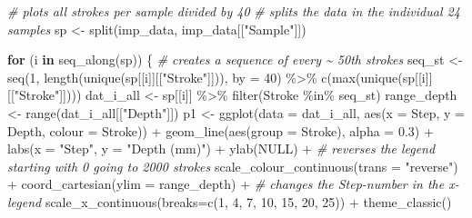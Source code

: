 \documentclass[
]{article}
\newenvironment{Shaded}{\begin{snugshade}}{\end{snugshade}}
\newcommand{\AttributeTok}[1]{\textcolor[rgb]{0.77,0.63,0.00}{#1}}
\newcommand{\CommentTok}[1]{\textcolor[rgb]{0.56,0.35,0.01}{\textit{#1}}}
\newcommand{\ConstantTok}[1]{\textcolor[rgb]{0.00,0.00,0.00}{#1}}
\newcommand{\ControlFlowTok}[1]{\textcolor[rgb]{0.13,0.29,0.53}{\textbf{#1}}}
\newcommand{\DecValTok}[1]{\textcolor[rgb]{0.00,0.00,0.81}{#1}}
\newcommand{\FloatTok}[1]{\textcolor[rgb]{0.00,0.00,0.81}{#1}}
\newcommand{\FunctionTok}[1]{\textcolor[rgb]{0.00,0.00,0.00}{#1}}
\newcommand{\NormalTok}[1]{#1}
\newcommand{\OtherTok}[1]{\textcolor[rgb]{0.56,0.35,0.01}{#1}}
\newcommand{\SpecialCharTok}[1]{\textcolor[rgb]{0.00,0.00,0.00}{#1}}
\newcommand{\StringTok}[1]{\textcolor[rgb]{0.31,0.60,0.02}{#1}}
\begin{document}
\begin{Shaded}
\begin{Highlighting}[]
\CommentTok{\# plots all strokes per sample divided by 40 }
\CommentTok{\# splits the data in the individual 24 samples}
\NormalTok{sp }\OtherTok{\textless{}{-}} \FunctionTok{split}\NormalTok{(imp\_data, imp\_data[[}\StringTok{"Sample"}\NormalTok{]])}


\ControlFlowTok{for}\NormalTok{ (i }\ControlFlowTok{in} \FunctionTok{seq\_along}\NormalTok{(sp)) \{}
  \CommentTok{\# creates a sequence of every \textasciitilde{} 50th strokes }
\NormalTok{  seq\_st }\OtherTok{\textless{}{-}} \FunctionTok{seq}\NormalTok{(}\DecValTok{1}\NormalTok{, }\FunctionTok{length}\NormalTok{(}\FunctionTok{unique}\NormalTok{(sp[[i]][[}\StringTok{"Stroke"}\NormalTok{]])), }\AttributeTok{by =} \DecValTok{40}\NormalTok{) }\SpecialCharTok{\%\textgreater{}\%} 
            \FunctionTok{c}\NormalTok{(}\FunctionTok{max}\NormalTok{(}\FunctionTok{unique}\NormalTok{(sp[[i]][[}\StringTok{"Stroke"}\NormalTok{]])))}
\NormalTok{  dat\_i\_all }\OtherTok{\textless{}{-}}\NormalTok{ sp[[i]] }\SpecialCharTok{\%\textgreater{}\%} 
               \FunctionTok{filter}\NormalTok{(Stroke }\SpecialCharTok{\%in\%}\NormalTok{ seq\_st)}
\NormalTok{  range\_depth }\OtherTok{\textless{}{-}} \FunctionTok{range}\NormalTok{(dat\_i\_all[[}\StringTok{"Depth"}\NormalTok{]])}
\NormalTok{  p1 }\OtherTok{\textless{}{-}} \FunctionTok{ggplot}\NormalTok{(}\AttributeTok{data =}\NormalTok{ dat\_i\_all, }\FunctionTok{aes}\NormalTok{(}\AttributeTok{x =}\NormalTok{ Step, }\AttributeTok{y =}\NormalTok{ Depth, }\AttributeTok{colour =}\NormalTok{ Stroke)) }\SpecialCharTok{+}
        \FunctionTok{geom\_line}\NormalTok{(}\FunctionTok{aes}\NormalTok{(}\AttributeTok{group =}\NormalTok{ Stroke), }\AttributeTok{alpha =} \FloatTok{0.3}\NormalTok{) }\SpecialCharTok{+} 
        \FunctionTok{labs}\NormalTok{(}\AttributeTok{x =} \StringTok{"Step"}\NormalTok{, }\AttributeTok{y =} \StringTok{"Depth (mm)"}\NormalTok{) }\SpecialCharTok{+} \FunctionTok{ylab}\NormalTok{(}\ConstantTok{NULL}\NormalTok{) }\SpecialCharTok{+}
        \CommentTok{\# reverses the legend starting with 0 going to 2000 strokes }
        \FunctionTok{scale\_colour\_continuous}\NormalTok{(}\AttributeTok{trans =} \StringTok{"reverse"}\NormalTok{) }\SpecialCharTok{+} 
        \FunctionTok{coord\_cartesian}\NormalTok{(}\AttributeTok{ylim =}\NormalTok{ range\_depth) }\SpecialCharTok{+}
        \CommentTok{\# changes the \textquotesingle{}Step{-}number\textquotesingle{} in the x{-}legend  }
        \FunctionTok{scale\_x\_continuous}\NormalTok{(}\AttributeTok{breaks=}\FunctionTok{c}\NormalTok{(}\DecValTok{1}\NormalTok{, }\DecValTok{4}\NormalTok{, }\DecValTok{7}\NormalTok{, }\DecValTok{10}\NormalTok{, }\DecValTok{15}\NormalTok{, }\DecValTok{20}\NormalTok{, }\DecValTok{25}\NormalTok{)) }\SpecialCharTok{+}
          \FunctionTok{theme\_classic}\NormalTok{()}
       

\end{Highlighting}
\end{Shaded}
\end{document}
